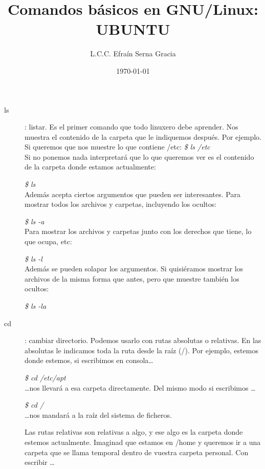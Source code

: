 \documentclass[12pt,spanish,lettersize,twocolumn]{article}
\title{\color{Maroon}Comandos b\'asicos en GNU/Linux: UBUNTU}
\author{L.C.C. Efra\'in Serna Gracia}
\date{\color{gray}\today}
\begin{document}
\maketitle
\begin{description}
\item[ls]: listar. Es el primer comando que todo linuxero debe aprender. Nos muestra el contenido de la carpeta que le indiquemos despu\'es. Por ejemplo. Si queremos que nos muestre lo que contiene /etc: \emph{\$ ls /etc}\\

Si no ponemos nada interpretar\'a que lo que queremos ver es el contenido de la carpeta donde estamos actualmente:

\emph{\$ ls}\\

Adem\'as acepta ciertos argumentos que pueden ser interesantes. Para mostrar todos los archivos y carpetas, incluyendo los ocultos:

\emph{\$ ls -a}\\

Para mostrar los archivos y carpetas junto con los derechos que tiene, lo que ocupa, etc:

\emph{\$ ls -l}\\

Adem\'as se pueden solapar los argumentos. Si quisi\'eramos mostrar los archivos de la misma forma que antes, pero que muestre tambi\'en los ocultos:

\emph{\$ ls -la}\\

\item[cd]: cambiar directorio. Podemos usarlo con rutas absolutas o relativas. En las absolutas le indicamos toda la ruta desde la ra\'iz (/). Por ejemplo, estemos donde estemos, si escribimos en consola\ldots

\emph{\$ cd /etc/apt}\\

\ldots nos llevar\'a a esa carpeta directamente. Del mismo modo si escribimos \ldots

\emph{\$ cd /}\\

\ldots nos mandar\'a a la ra\'iz del sistema de ficheros.

Las rutas relativas son relativas a algo, y ese algo es la carpeta donde estemos actualmente. Imaginad que estamos en /home y queremos ir a una carpeta que se llama temporal dentro de vuestra carpeta personal. Con escribir \ldots


\end{description}
\end{document}
